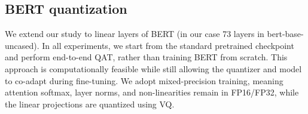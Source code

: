 \documentclass{article}
\theoremstyle{definition}
\theoremstyle{remark}
\begin{document}


\subsection{BERT quantization}
We extend our study to linear layers of BERT (in our case 73 layers in bert-base-uncased). In all experiments, we start from the standard pretrained checkpoint and perform end-to-end QAT, rather than training BERT from scratch. This approach is computationally feasible while still allowing the quantizer and model to co-adapt during fine-tuning. We adopt mixed-precision training, meaning attention softmax, layer norms, and non-linearities remain in FP16/FP32, while the linear projections are quantized using VQ.
\end{document}
